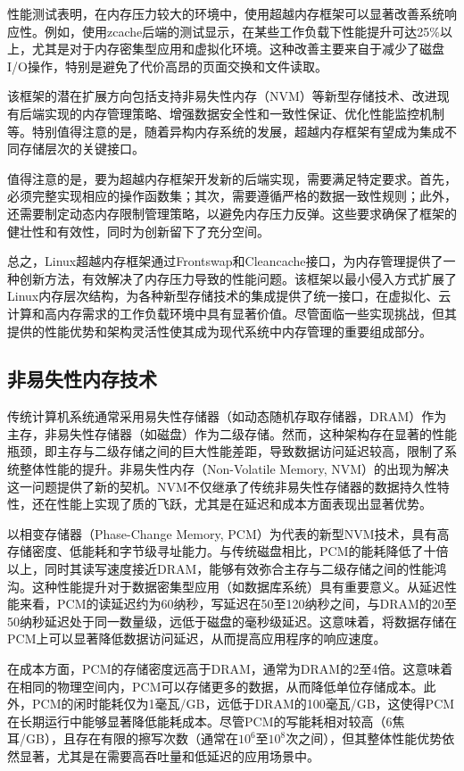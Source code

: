 性能测试表明，在内存压力较大的环境中，使用超越内存框架可以显著改善系统响应性。例如，使用zcache后端的测试显示，在某些工作负载下性能提升可达25\%以上，尤其是对于内存密集型应用和虚拟化环境。这种改善主要来自于减少了磁盘I/O操作，特别是避免了代价高昂的页面交换和文件读取。

该框架的潜在扩展方向包括支持非易失性内存（NVM）等新型存储技术、改进现有后端实现的内存管理策略、增强数据安全性和一致性保证、优化性能监控机制等。特别值得注意的是，随着异构内存系统的发展，超越内存框架有望成为集成不同存储层次的关键接口。

值得注意的是，要为超越内存框架开发新的后端实现，需要满足特定要求。首先，必须完整实现相应的操作函数集；其次，需要遵循严格的数据一致性规则；此外，还需要制定动态内存限制管理策略，以避免内存压力反弹。这些要求确保了框架的健壮性和有效性，同时为创新留下了充分空间。

总之，Linux超越内存框架通过Frontswap和Cleancache接口，为内存管理提供了一种创新方法，有效解决了内存压力导致的性能问题。该框架以最小侵入方式扩展了Linux内存层次结构，为各种新型存储技术的集成提供了统一接口，在虚拟化、云计算和高内存需求的工作负载环境中具有显著价值。尽管面临一些实现挑战，但其提供的性能优势和架构灵活性使其成为现代系统中内存管理的重要组成部分。

\subsection{非易失性内存技术}

传统计算机系统通常采用易失性存储器（如动态随机存取存储器，DRAM）作为主存，非易失性存储器（如磁盘）作为二级存储。然而，这种架构存在显著的性能瓶颈，即主存与二级存储之间的巨大性能差距，导致数据访问延迟较高，限制了系统整体性能的提升。非易失性内存（Non-Volatile Memory, NVM）的出现为解决这一问题提供了新的契机。NVM不仅继承了传统非易失性存储器的数据持久性特性，还在性能上实现了质的飞跃，尤其是在延迟和成本方面表现出显著优势。

以相变存储器（Phase-Change Memory, PCM）为代表的新型NVM技术，具有高存储密度、低能耗和字节级寻址能力。与传统磁盘相比，PCM的能耗降低了十倍以上，同时其读写速度接近DRAM，能够有效弥合主存与二级存储之间的性能鸿沟。这种性能提升对于数据密集型应用（如数据库系统）具有重要意义。从延迟性能来看，PCM的读延迟约为60纳秒，写延迟在50至120纳秒之间，与DRAM的20至50纳秒延迟处于同一数量级，远低于磁盘的毫秒级延迟。这意味着，将数据存储在PCM上可以显著降低数据访问延迟，从而提高应用程序的响应速度。

在成本方面，PCM的存储密度远高于DRAM，通常为DRAM的2至4倍。这意味着在相同的物理空间内，PCM可以存储更多的数据，从而降低单位存储成本。此外，PCM的闲时能耗仅为1毫瓦/GB，远低于DRAM的100毫瓦/GB，这使得PCM在长期运行中能够显著降低能耗成本。尽管PCM的写能耗相对较高（6焦耳/GB），且存在有限的擦写次数（通常在$10^6$至$10^8$次之间），但其整体性能优势依然显著，尤其是在需要高吞吐量和低延迟的应用场景中。

